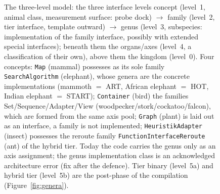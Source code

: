 \begin{nurlang}
\begin{figure}[htbp]
\caption{The three-level model: the three interface levels concept (level~1, animal class, measurement surface: probe dock) $\to$ family (level~2, tier interface, template outward) $\to$ genus (level~3, subspecies: implementation of the family interface, possibly with extended special interfaces); beneath them the organs/axes (level~4, a classification of their own), above them the kingdom (level~0). Four concepts: \texttt{Map} (mammal) possesses as its sole family \texttt{SearchAlgorithm} (elephant), whose genera are the concrete implementations (mammoth $=$ ART, African elephant $=$ HOT, Indian elephant $=$ START); \texttt{Container} (bird) the families Set/Sequence/Adapter/View (woodpecker/stork/cockatoo/falcon), which are formed from the same axis pool; \texttt{Graph} (plant) is laid out as an interface, a family is not implemented; \texttt{HeuristikAdapter} (insect) possesses the reroute family \texttt{FunctionInterfaceReroute} (ant) of the hybrid tier. Today the code carries the genus only as an axis assignment; the genus implementation class is an acknowledged architecture error (fix after the defence). Tier binary (level~5a) and hybrid tier (level~5b) are the post-phase of the compilation (Figure~\ref{fig:genera}).}\label{fig:three-levels}

\end{figure}
\end{nurlang}
